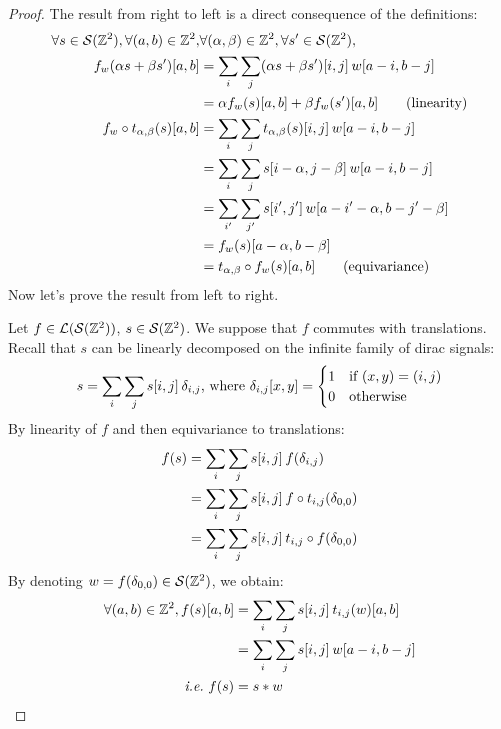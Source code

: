 \begin{proof}
The result from right to left is a direct consequence of the definitions:
\begin{align}
\forall s \in \cs(\bbz^2), \forall (a,b) \in \bbz^2, & \forall (\alpha, \beta) \in \bbz^2, \forall s' \in \cs(\bbz^2),\nonumber\\
 f_w(\alpha s + \beta s')[a,b] & = \displaystyle \sum_i \sum_j (\alpha s + \beta s')[i,j] \h{2} w[a-i, b-j]\nonumber\\
 & = \alpha f_w(s)[a,b] + \beta f_w(s')[a,b] \tag{linearity}\\
f_w \circ t_{\alpha,\beta} (s)[a,b] & = \displaystyle \sum_i \sum_j t_{\alpha,\beta}(s)[i,j] \h{2} w[a-i, b-j]\nonumber\\
 & = \displaystyle \sum_i \sum_j s[i - \alpha,j - \beta] \h{2} w[a-i, b-j]\nonumber\\
 & = \displaystyle \sum_{i'} \sum_{j'} s[i',j'] \h{2} w[a - i' - \alpha, b - j'- \beta]\label{eq:bij}\\
 & = f_w (s)[a - \alpha,b - \beta]\nonumber\\
 & = t_{\alpha,\beta} \circ f_w (s)[a,b] \tag{equivariance}
\end{align}
Now let's prove the result from left to right.

Let $f \in \cl(\cs(\bbz^2))$, $s \in \cs(\bbz^2)$. We suppose that $f$ commutes with translations. Recall that $s$ can be linearly decomposed on the infinite family of dirac signals:
\begin{gather*}
s = \displaystyle \sum_i \sum_j s[i,j] \h{2} \delta_{i,j} \text{, where }
\delta_{i,j}[x,y] = \begin{cases} 1 & \text{if } (x,y) = (i,j)\\ 0 & \text{otherwise} \end{cases}
\end{gather*}
By linearity of $f$ and then equivariance to translations:
\begin{align*}
f(s) & = \displaystyle \sum_i \sum_j s[i,j] \h{2} f(\delta_{i,j})\\
 & = \displaystyle \sum_i \sum_j s[i,j] \h{2} f \circ t_{i,j} (\delta_{0,0})\\
 & = \displaystyle \sum_i \sum_j s[i,j] \h{2} t_{i,j} \circ f (\delta_{0,0})
\end{align*}
By denoting $w = f (\delta_{0,0}) \in \cs(\bbz^2)$, we obtain:
\begin{align}
\forall (a,b) \in \bbz^2, f(s)[a,b] & = \displaystyle \sum_i \sum_j s[i,j] \h{2} t_{i,j}(w)[a,b] \label{eq:conv}\\
 & = \displaystyle \sum_i \sum_j s[i,j] \h{2} w[a-i, b-j] \nonumber\\
\text{\ie } f(s) & = s \ast w \nonumber
\end{align}
\end{proof}

